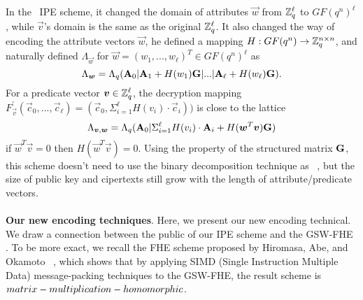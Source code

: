 In the~\cite{PKC:Xagawa13} IPE scheme, it changed the domain of attributes $\vec{w}$ from $\mathbb{Z}^{\ell}_{q}$ to $GF(q^{n})^{\ell}$, while $\vec{v}$'s domain is the same as the original $\mathbb{Z}^{\ell}_{q}$. It also changed the way of encoding the attribute vectors $\vec{w}$, he defined a mapping $H: GF(q^{n})\rightarrow \mathbb{Z}^{n\times n}_{q}$, and naturally defined $\Lambda_{\vec{w}}$ for $\vec{w}=(w_{1},...,w_{\ell})^{T}\in GF(q^{n})^{\ell}$ as
$$ \Lambda_{\boldsymbol{w}}=\Lambda_{q}(\mathbf{A}_{0}|\mathbf{A}_{1}+H(w_{1})\mathbf{G}|...|\mathbf{A}_{\ell}+H(w_{\ell})\mathbf{G}).$$
For a predicate vector $\boldsymbol{v}\in \mathbb{Z}^{\ell}_{q}$,  the decryption mapping $F^{'}_{\vec{v}}(\vec{c}_{0},...,\vec{c}_{\ell})=(\vec{c}_{0},\Sigma^{\ell}_{i=1}H(v_{i})\cdot \vec{c}_{i}))$ is close to the lattice
$$ \Lambda_{\boldsymbol{v},\boldsymbol{w}}=\Lambda_{q}(\mathbf{A}_{0}|\Sigma^{\ell}_{i=1}H(v_{i})\cdot \mathbf{A}_{i}+H(\boldsymbol{w}^{T}\boldsymbol{v})\mathbf{G}) $$
if $\vec{w}^{T}\vec{v}=0$ then $H(\vec{w}^{T}\vec{v})=0$. Using the property of the structured matrix $\mathbf{G}$, this scheme doesn't need to use the binary decomposition technique as ~\cite{AC:AgrFreVai11}, but the size of public key and cipertexts still grow with the length of attribute/predicate vectors.\\
\\
\textbf{Our new encoding techniques}. Here, we present our new encoding technical. We draw a connection between the public of our IPE scheme and the GSW-FHE~ \cite{C:GenSahWat13}. To be more exact, we recall the FHE scheme proposed by Hiromasa, Abe, and Okamoto~ \cite{PKC:HirAbeOka15}, which shows that by applying SIMD (Single Instruction Multiple Data) message-packing techniques to the GSW-FHE, the result scheme is $matrix-\\multiplication-homomorphic$.\

